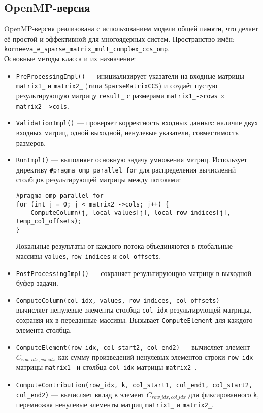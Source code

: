 \documentclass[12pt]{extarticle}
\begin{document}
\subsection{OpenMP-версия}

\hspace*{1.25cm}OpenMP-версия реализована с использованием модели общей памяти, что делает её простой и эффективной для многоядерных систем. Пространство имён: \texttt{korneeva\_e\_sparse\_matrix\_mult\_complex\_ccs\_omp}. \\[-0.2cm]

Основные методы класса и их назначение:
\begin{itemize}
    \item \texttt{PreProcessingImpl()} — инициализирует указатели на входные матрицы \texttt{matrix1\_} и \texttt{matrix2\_} (типа \texttt{SparseMatrixCCS}) и создаёт пустую результирующую матрицу \texttt{result\_} с размерами \texttt{matrix1\_->rows} $\times$ \texttt{matrix2\_->cols}.
    \item \texttt{ValidationImpl()} — проверяет корректность входных данных: наличие двух входных матриц, одной выходной, ненулевые указатели, совместимость размеров.
    \item \texttt{RunImpl()} — выполняет основную задачу умножения матриц. Использует директиву \texttt{\#pragma omp parallel for} для распределения вычислений столбцов результирующей матрицы между потоками:

    \begin{lstlisting}[caption={Параллельное вычисление столбцов в методе RunImpl},label={lst:openmp_run}]
#pragma omp parallel for
for (int j = 0; j < matrix2_->cols; j++) {
    ComputeColumn(j, local_values[j], local_row_indices[j], temp_col_offsets);
}
    \end{lstlisting}
Локальные результаты от каждого потока объединяются в глобальные массивы \texttt{values}, \texttt{row\_indices} и \texttt{col\_offsets}.
    \item \texttt{PostProcessingImpl()} — сохраняет результирующую матрицу в выходной буфер задачи.
   \item \texttt{ComputeColumn(col\_idx, values, row\_indices, col\_offsets)} — вычисляет ненулевые элементы столбца \texttt{col\_idx} результирующей матрицы, сохраняя их в переданные массивы. Вызывает \texttt{ComputeElement} для каждого элемента столбца.
    \item \texttt{ComputeElement(row\_idx, col\_start2, col\_end2)} — вычисляет элемент $C_{row\_idx, col\_idx}$ как сумму произведений ненулевых элементов строки \texttt{row\_idx} матрицы \texttt{matrix1\_} и столбца \texttt{col\_idx} матрицы \texttt{matrix2\_}.
    \item \texttt{ComputeContribution(row\_idx, k, col\_start1, col\_end1, col\_start2, col\_end2)} — вычисляет вклад в элемент  $C_{row\_idx, col\_idx}$ для фиксированного \texttt{k}, перемножая ненулевые элементы матриц \texttt{matrix1\_} и \texttt{matrix2\_}.
\end{itemize}
\end{document}
